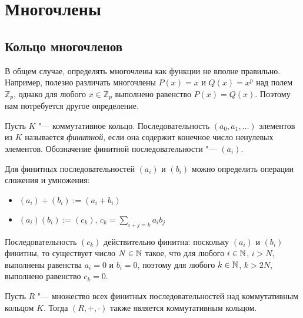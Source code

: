 \section{Многочлены}

\subsection{Кольцо многочленов}

\begin{note}
	В общем случае, определять многочлены как функции не вполне правильно. Например, полезно различать многочлены $P(x) = x$ и $Q(x) = x^p$ над полем $\mathbb{Z}_p$, однако для любого $x \in \mathbb{Z}_p$ выполнено равенство $P(x) = Q(x)$. Поэтому нам потребуется другое определение.
\end{note}

\begin{definition}
	Пусть $K$ "--- коммутативное кольцо. Последовательность $(a_0, a_1, \dots)$ элементов из $K$ называется \textit{финитной}, если она содержит конечное число ненулевых элементов. Обозначение финитной последовательности "--- $(a_i)$.
\end{definition}

\begin{definition}
	Для финитных последовательностей $(a_i)$ и $(b_i)$ можно определить операции сложения и умножения:
	\begin{itemize}
		\item $(a_i) + (b_i) := (a_i + b_i)$
		\item $(a_i)(b_i) := (c_k)$, $c_k = \sum_{i + j = k}a_ib_j$
	\end{itemize}
\end{definition}

\begin{note}
	Последовательность $(c_k)$ действительно финитна: поскольку $(a_i)$ и $(b_i)$ финитны, то существует число $N \in \mathbb{N}$ такое, что для любого $i \in \mathbb{N}$, $i > N$, выполнены равенства $a_i = 0$ и $b_i = 0$, поэтому для любого $k \in \mathbb{N}$, $k > 2N$, выполнено равенство $c_k = 0$.
\end{note}

\begin{theorem}
	Пусть $R$ "--- множество всех финитных последовательностей над коммутативным кольцом $K$. Тогда $(R, +, \cdot)$ также является коммутативным кольцом.
\end{theorem}

